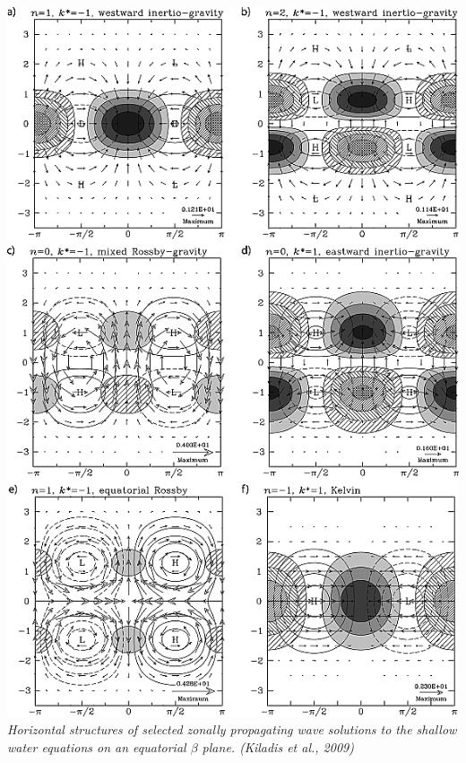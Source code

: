 \begin{solution}
\includegraphics[height=0.7\textheight]{graphics/rog1687-fig-0003.png}\\
\textit{Horizontal structures of selected zonally propagating wave solutions to the shallow water equations on an equatorial $\beta$ plane. (Kiladis et al., 2009)}
\end{solution}

